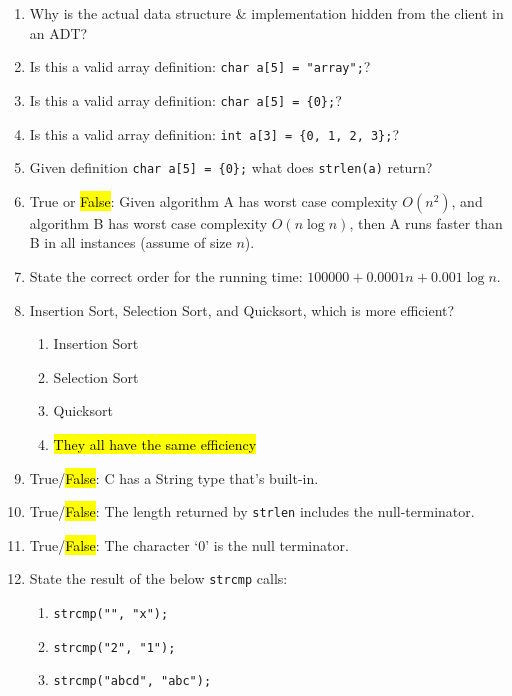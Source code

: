 \documentclass{article}
\begin{document}
\begin{enumerate}
    \item Why is the actual data structure \& implementation hidden from the client in an ADT?
    \vspace{16mm}
    \item Is this a valid array definition: \texttt{char a[5] = "array";}?
    \item Is this a valid array definition: \texttt{char a[5] = \{0\};}?
    \item Is this a valid array definition: \texttt{int a[3] = \{0, 1, 2, 3\};}?
    \item Given definition \texttt{char a[5] = \{0\};} what does \texttt{strlen(a)} return?
    \vspace{16mm}
    \item True or \hl{False}: Given algorithm A has worst case complexity $O(n^2)$, and algorithm B has worst case complexity $O(n\log n)$, then A runs faster than B in all instances (assume of size $n$).
    \item State the correct order for the running time: $100000 + 0.0001n + 0.001\log n$.
    \vspace{16mm}
    \item Insertion Sort, Selection Sort, and Quicksort, which is more efficient?
    \begin{enumerate}[label=\alph*.]
        \item Insertion Sort
        \item Selection Sort
        \item Quicksort
        \item \hl{They all have the same efficiency}
    \end{enumerate}
    \item True/\hl{False}: C has a String type that’s built-in.
    \item True/\hl{False}: The length returned by \texttt{strlen} includes the null-terminator.
    \item True/\hl{False}: The character ‘0’ is the null terminator.
    \item State the result of the below \texttt{strcmp} calls:
    \begin{enumerate}[label=\alph*.]
        \item \texttt{strcmp("", "x");}
        \item \texttt{strcmp("2", "1");}
        \item \texttt{strcmp("abcd", "abc");}
    \end{enumerate}
    \vspace{16mm}


\end{enumerate}
\end{document}
